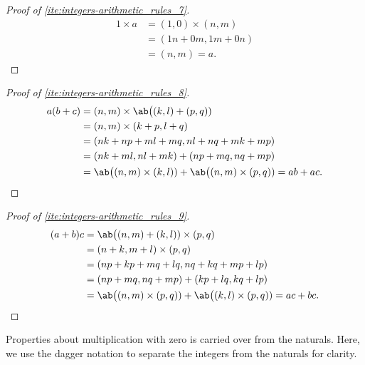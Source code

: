 \begin{proof}[Proof of \cref{ite:integers-arithmetic_rules_7}]
  \begin{align}
    1 \times a & = (1, 0) \times (n, m) \\
               & = (1n + 0m, 1m + 0n)   \\
               & = (n, m) = a.
  \end{align}
\end{proof}

\begin{proof}[Proof of \cref{ite:integers-arithmetic_rules_8}]
  \begin{align}
    a(b + c) & = (n, m) \times \ab\big((k, l) + (p, q))                                            \\
             & = (n, m) \times (k + p, l + q)                                                      \\
             & = (nk + np + ml + mq, nl + nq + mk + mp)                                            \\
             & = (nk + ml, nl + mk) + (np + mq, nq + mp)                                           \\
             & = \ab\big((n, m) \times (k, l)) + \ab\big((n, m) \times (p, q)) = ab + ac. \qedhere
  \end{align}
\end{proof}

\begin{proof}[Proof of \cref{ite:integers-arithmetic_rules_9}]
  \begin{align}
    (a + b)c & = \ab\big((n, m) + (k, l)) \times (p, q)                                            \\
             & = (n + k, m + l) \times (p, q)                                                      \\
             & = (np + kp + mq + lq, nq + kq + mp + lp)                                            \\
             & = (np + mq, nq + mp) + (kp + lq, kq + lp)                                           \\
             & = \ab\big((n, m) \times (p, q)) + \ab\big((k, l) \times (p, q)) = ac + bc. \qedhere
  \end{align}
\end{proof}

Properties about multiplication with zero is carried over from the naturals. Here, we use the dagger
notation to separate the integers from the naturals for clarity.

